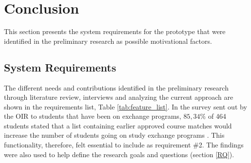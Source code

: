 \section{Conclusion}

This section presents the system requirements for the prototype that were identified in the preliminary research as possible motivational factors.

\subsection{System Requirements}\label{sec:requirements}

The different needs and contributions identified in the preliminary research through literature review, interviews and analyzing the current approach are shown in the requirements list, Table \ref{tab:feature_list}. In the survey sent out by the OIR to students that have been on exchange programs, $85,34\%$ of 464 students stated that a list containing earlier approved course matches would increase the number of students going on study exchange programs \cite{intersek_report}. This functionality, therefore, felt essential to include as requirement \#2. The findings were also used to help define the research goals and questions (section \ref{RQ}). 


